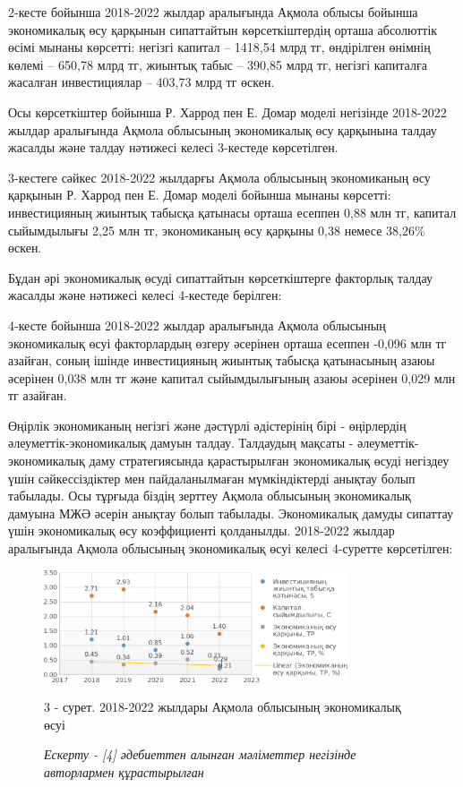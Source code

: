 \begin{multicols}{2}
2-кесте бойынша 2018-2022 жылдар аралығында Ақмола облысы бойынша
экономикалық өсу қарқынын сипаттайтын көрсеткіштердің орташа абсолюттік
өсімі мынаны көрсетті: негізгі капитал -- 1418,54 млрд тг, өндірілген
өнімнің көлемі -- 650,78 млрд тг, жиынтық табыс -- 390,85 млрд тг,
негізгі капиталға жасалған инвестициялар -- 403,73 млрд тг өскен.

Осы көрсеткіштер бойынша Р. Харрод пен Е. Домар моделі негізінде
2018-2022 жылдар аралығында Ақмола облысының экономикалық өсу қарқынына
талдау жасалды және талдау нәтижесі келесі 3-кестеде көрсетілген.

3-кестеге сәйкес 2018-2022 жылдарғы Ақмола облысының экономиканың өсу
қарқынын Р. Харрод пен Е. Домар моделі бойынша мынаны көрсетті:
инвестицияның жиынтық табысқа қатынасы орташа есеппен 0,88 млн тг,
капитал сыйымдылығы 2,25 млн тг, экономиканың өсу қарқыны 0,38 немесе
38,26\% өскен.

Бұдан әрі экономикалық өсуді сипаттайтын көрсеткіштерге факторлық талдау
жасалды және нәтижесі келесі 4-кестеде берілген:

4-кесте бойынша 2018-2022 жылдар аралығында Ақмола облысының
экономикалық өсуі факторлардың өзгеру әсерінен орташа есеппен -0,096 млн
тг азайған, соның ішінде инвестицияның жиынтық табысқа қатынасының азаюы
әсерінен 0,038 млн тг және капитал сыйымдылығының азаюы әсерінен 0,029
млн тг азайған.

Өңірлік экономиканың негізгі және дәстүрлі әдістерінің бірі - өңірлердің
әлеуметтік-экономикалық дамуын талдау. Талдаудың мақсаты -
әлеуметтік-экономикалық даму стратегиясында қарастырылған экономикалық
өсуді негіздеу үшін сәйкессіздіктер мен пайдаланылмаған мүмкіндіктерді
анықтау болып табылады. Осы тұрғыда біздің зерттеу Ақмола облысының
экономикалық дамуына МЖӘ әсерін анықтау болып табылады. Экономикалық
дамуды сипаттау үшін экономикалық өсу коэффициенті қолданылды. 2018-2022
жылдар аралығында Ақмола облысының экономикалық өсуі келесі 4-суретте
көрсетілген:
\end{multicols}

\begin{figure}[H]
	\centering
	\includegraphics[width=0.8\textwidth]{assets/340.5}
	\caption*{3 - сурет. 2018-2022 жылдары Ақмола облысының экономикалық өсуі}
	\caption*{\normalfont \emph{Ескерту - {[}4{]} әдебиеттен алынған мәліметтер негізінде авторлармен құрастырылған}}
\end{figure}

